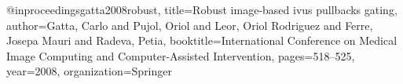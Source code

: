@inproceedings{gatta2008robust,
  title={Robust image-based ivus pullbacks gating},
  author={Gatta, Carlo and Pujol, Oriol and Leor, Oriol Rodriguez and Ferre, Josepa Mauri and Radeva, Petia},
  booktitle={International Conference on Medical Image Computing and Computer-Assisted Intervention},
  pages={518--525},
  year={2008},
  organization={Springer}
}
